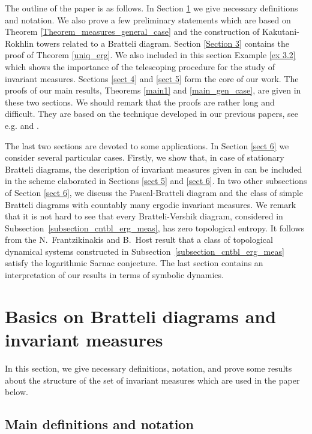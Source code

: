 \documentclass[11pt, english, reqno]{amsart}
\theoremstyle{definition}
\theoremstyle{remark}
\theoremstyle{plain}
\numberwithin{equation}{section}
\begin{document}
The outline of  the paper is as follows. In Section \ref{sect 2} we give 
necessary definitions and notation. We also prove a few preliminary 
statements which are based on Theorem 
\ref{Theorem_measures_general_case} and the construction of 
Kakutani-Rokhlin towers related to a Bratteli diagram. 
Section \ref{Section 3} contains the proof of 
Theorem \ref{uniq_erg}. We also included in this section  Example  
\ref{ex 3.2} which shows the importance of the telescoping procedure 
for the study of invariant measures. Sections \ref{sect 4} and \ref{sect 5}
 form the core of our work. The proofs of our main results, Theorems
\ref{main1} and \ref{main_gen_case}, are given in these two sections. 
We should remark that the proofs are rather long and  difficult. They are
based on the technique developed in our previous papers, see e.g. 
\cite{BezuglyiKwiatkowskiMedynetsSolomyak2013} and 
\cite{AdamskaBezuglyiKarpelKwiatkowski2016}.

The last two sections are devoted to some applications. In Section 
\ref{sect 6} we consider several particular cases. Firstly, we show that, 
in case of stationary Bratteli diagrams, the description of invariant 
measures given in 
\cite{BezuglyiKwiatkowskiMedynetsSolomyak2010}
can be included in the scheme elaborated in Sections \ref{sect 5} and   
\ref{sect 6}. In two other subsections of Section \ref{sect 6}, we
 discuss the Pascal-Bratteli diagram and the class of simple Bratteli 
 diagrams with countably many 
 ergodic invariant measures. We remark that it is not hard to see that
  every  Bratteli-Vershik
diagram,  considered in Subsection~\ref{subsection_cntbl_erg_meas},
 has zero topological entropy. It follows from the N.~Frantzikinakis
and B.~Host result \cite{FrantzikinakisHost2017} that a class of topological
dynamical systems constructed in Subsection~\ref{subsection_cntbl_erg_meas} satisfy the logarithmic Sarnac conjecture.
The last  section  contains an interpretation of our results 
 in terms of symbolic dynamics.

\section{Basics on Bratteli diagrams and invariant measures}\label{sect 2}

In this section, we give necessary definitions, notation, and prove some
results about the structure of the set of invariant measures which are used
 in the paper below.

\subsection{Main definitions and notation}
\end{document}
